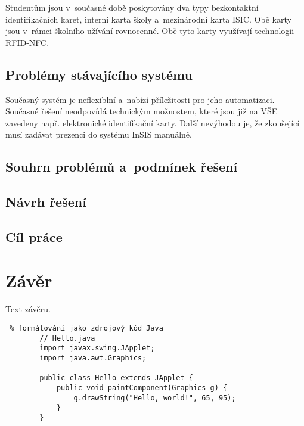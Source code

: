 \documentclass[12pt, a4paper]{report}
\begin{document}
		Studentům jsou v~současné době poskytovány dva typy bezkontaktní identifikačních karet, interní karta školy a~mezinárodní karta ISIC.
		Obě karty jsou v~rámci školního užívání rovnocenné. Obě tyto karty využívají technologii RFID-NFC.
		\section{Problémy stávajícího systému}
		Současný systém je neflexiblní a~nabízí příležitosti pro jeho automatizaci. 
		Současné řešení neodpovídá technickým možnostem, které jsou již na VŠE zavedeny např. elektronické identifikační karty.
		Další nevýhodou je, že zkoušející musí zadávat prezenci do systému InSIS manuálně.
		\section{Souhrn problémů a~podmínek řešení}
		\section{Návrh řešení}
		\section{Cíl práce}
	
	\chapter*{Závěr}
	Text závěru.
	
	

	\newpage

	\begin{lstlisting} % formátování jako zdrojový kód Java
		// Hello.java
		import javax.swing.JApplet;
		import java.awt.Graphics;

		public class Hello extends JApplet {
			public void paintComponent(Graphics g) {
				g.drawString("Hello, world!", 65, 95);
			}    
		}
	\end{lstlisting}
	
\end{document}
